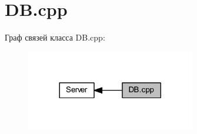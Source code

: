 \hypertarget{group__dbcpp}{}\section{D\+B.\+cpp}
\label{group__dbcpp}
Граф связей класса D\+B.\+cpp\+:
\nopagebreak
\begin{figure}[H]
\begin{center}
\leavevmode
\includegraphics[width=209pt]{group__dbcpp}
\end{center}
\end{figure}

